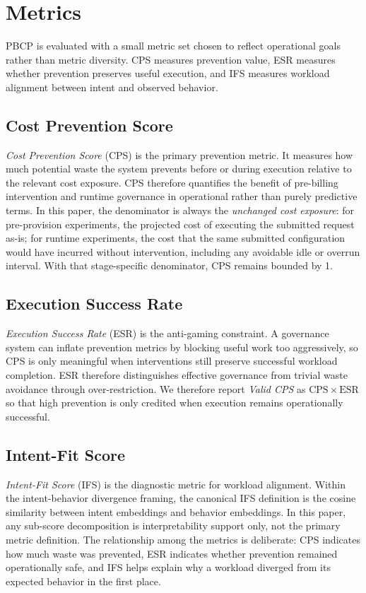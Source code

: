 \section{Metrics}


PBCP is evaluated with a small metric set chosen to reflect operational goals
rather than metric diversity. CPS measures prevention value, ESR measures
whether prevention preserves useful execution, and IFS measures workload
alignment between intent and observed behavior.

\subsection{Cost Prevention Score}

\emph{Cost Prevention Score} (CPS) is the primary prevention metric. It measures
how much potential waste the system prevents before or during execution relative
to the relevant cost exposure. CPS therefore quantifies the benefit of
pre-billing intervention and runtime governance in operational rather than purely
predictive terms. In this paper, the denominator is always the \emph{unchanged
cost exposure}: for pre-provision experiments, the projected cost of executing
the submitted request as-is; for runtime experiments, the cost that the same
submitted configuration would have incurred without intervention, including any
avoidable idle or overrun interval. With that stage-specific denominator, CPS
remains bounded by 1.

\subsection{Execution Success Rate}

\emph{Execution Success Rate} (ESR) is the anti-gaming constraint. A governance
system can inflate prevention metrics by blocking useful work too aggressively,
so CPS is only meaningful when interventions still preserve successful workload
completion. ESR therefore distinguishes effective governance from trivial waste
avoidance through over-restriction. We therefore report \emph{Valid CPS} as
$\mathrm{CPS} \times \mathrm{ESR}$ so that high prevention is only credited when
execution remains operationally successful.

\subsection{Intent-Fit Score}

\emph{Intent-Fit Score} (IFS) is the diagnostic metric for workload alignment.
Within the intent-behavior divergence framing, the canonical IFS definition is
the cosine similarity between intent embeddings and behavior embeddings. In this
paper, any sub-score decomposition is interpretability support only, not the
primary metric definition. The relationship among the metrics is deliberate: CPS
indicates how much waste was prevented, ESR indicates whether prevention
remained operationally safe, and IFS helps explain why a workload diverged from
its expected behavior in the first place.
